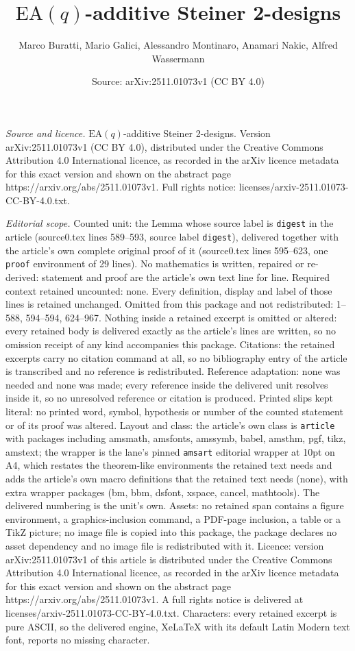 \documentclass[10pt,a4paper]{amsart}
\title[$\mathrm{ EA}(q)$-additive Steiner 2-designs]{$\mathrm{ EA}(q)$-additive Steiner 2-designs}
\author{Marco Buratti, Mario Galici, Alessandro Montinaro, Anamari Nakic, Alfred Wassermann}
\date{Source: arXiv:2511.01073v1 (CC BY 4.0)}
\begin{document}
\maketitle

\noindent\emph{Source and licence.} $\mathrm{ EA}(q)$-additive Steiner 2-designs. Version arXiv:2511.01073v1 (CC BY 4.0), distributed under the Creative Commons Attribution 4.0 International licence, as recorded in the arXiv licence metadata for this exact version and shown on the abstract page https://arxiv.org/abs/2511.01073v1. Full rights notice: licenses/arxiv-2511.01073-CC-BY-4.0.txt.\par\smallskip

\noindent\textit{Editorial scope.} Counted unit: the Lemma whose source label is \texttt{digest} in the article (source0.tex lines 589--593, source label \texttt{digest}), delivered together with the article's own complete original proof of it (source0.tex lines 595--623, one \texttt{proof} environment of 29 lines). No mathematics is written, repaired or re-derived: statement and proof are the article's own text line for line. Required context retained uncounted: none. Every definition, display and label of those lines is retained unchanged. Omitted from this package and not redistributed: 1--588, 594--594, 624--967. Nothing inside a retained excerpt is omitted or altered: every retained body is delivered exactly as the article's lines are written, so no omission receipt of any kind accompanies this package. Citations: the retained excerpts carry no citation command at all, so no bibliography entry of the article is transcribed and no reference is redistributed. Reference adaptation: none was needed and none was made; every reference inside the delivered unit resolves inside it, so no unresolved reference or citation is produced. Printed slips kept literal: no printed word, symbol, hypothesis or number of the counted statement or of its proof was altered. Layout and class: the article's own class is \texttt{article} with packages including amsmath, amsfonts, amssymb, babel, amsthm, pgf, tikz, amstext; the wrapper is the lane's pinned \texttt{amsart} editorial wrapper at 10pt on A4, which restates the theorem-like environments the retained text needs and adds the article's own macro definitions that the retained text needs (none), with extra wrapper packages (bm, bbm, dsfont, xspace, cancel, mathtools). The delivered numbering is the unit's own. Assets: no retained span contains a figure environment, a graphics-inclusion command, a PDF-page inclusion, a table or a TikZ picture; no image file is copied into this package, the package declares no asset dependency and no image file is redistributed with it. Licence: version arXiv:2511.01073v1 of this article is distributed under the Creative Commons Attribution 4.0 International licence, as recorded in the arXiv licence metadata for this exact version and shown on the abstract page https://arxiv.org/abs/2511.01073v1. A full rights notice is delivered at licenses/arxiv-2511.01073-CC-BY-4.0.txt. Characters: every retained excerpt is pure ASCII, so the delivered engine, XeLaTeX with its default Latin Modern text font, reports no missing character.
\end{document}
